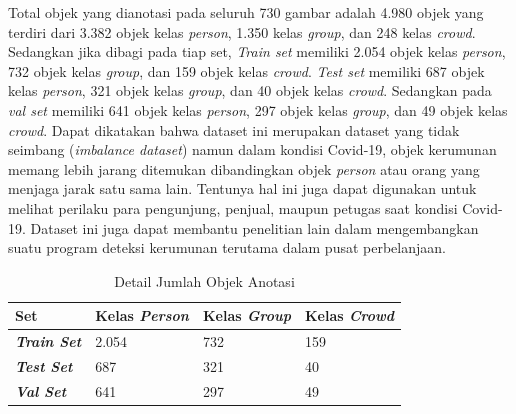 Total objek yang dianotasi pada seluruh 730 gambar adalah 4.980 objek yang terdiri dari 3.382 objek kelas 
\textit{person}, 1.350 kelas \textit{group}, dan 248 kelas \textit{crowd}. Sedangkan jika dibagi pada tiap set,
\textit{Train set} memiliki 2.054 objek kelas \textit{person}, 732 objek kelas \textit{group}, dan 159 objek
kelas \textit{crowd}. \textit{Test set} memiliki 687 objek kelas \textit{person}, 321 objek kelas \textit{group},
dan 40 objek kelas \textit{crowd}. Sedangkan pada \textit{val set} memiliki 641 objek kelas \textit{person}, 
297 objek kelas \textit{group}, dan 49 objek kelas \textit{crowd}. Dapat dikatakan bahwa dataset ini merupakan
dataset yang tidak seimbang (\textit{imbalance dataset}) namun dalam kondisi Covid-19, objek kerumunan memang lebih
jarang ditemukan dibandingkan objek \textit{person} atau orang yang menjaga jarak satu sama lain. Tentunya hal ini
juga dapat digunakan untuk melihat perilaku para pengunjung, penjual, maupun petugas saat kondisi Covid-19. Dataset
ini juga dapat membantu penelitian lain dalam mengembangkan suatu program deteksi kerumunan terutama dalam pusat 
perbelanjaan.

\begin{table}[h]
    \caption{Detail Jumlah Objek Anotasi}
    \label{tab:specs_collab}
    \centering
    \begin{tabular}{|l|l|l|l|}
        \hline
        \textbf{Set}                    & Kelas \textit{Person} & Kelas \textit{Group} & Kelas \textit{Crowd}   \\ \hline
        \textit{\textbf{Train Set}}      & 2.054 & 732 & 159        \\ \hline
        \textit{\textbf{Test Set}}     & 687 & 321 & 40             \\ \hline
        \textit{\textbf{Val Set}}       & 641 & 297 & 49            \\ \hline
    \end{tabular}
\end{table}

